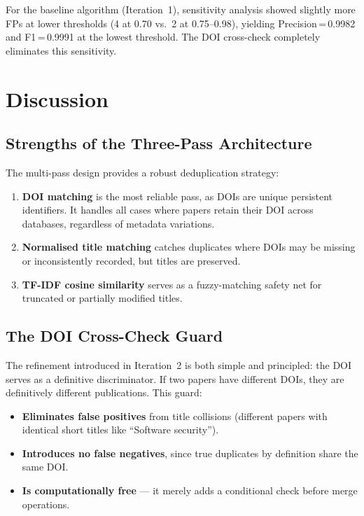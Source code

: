 \documentclass[conference]{IEEEtran}
\begin{document}
For the baseline algorithm (Iteration~1), sensitivity analysis showed slightly more FPs at lower thresholds (4 at 0.70 vs.\ 2 at 0.75--0.98), yielding Precision\,=\,0.9982 and F1\,=\,0.9991 at the lowest threshold. The DOI cross-check completely eliminates this sensitivity.

\section{Discussion}

\subsection{Strengths of the Three-Pass Architecture}

The multi-pass design provides a robust deduplication strategy:

\begin{enumerate}
    \item \textbf{DOI matching} is the most reliable pass, as DOIs are unique persistent identifiers. It handles all cases where papers retain their DOI across databases, regardless of metadata variations.
    \item \textbf{Normalised title matching} catches duplicates where DOIs may be missing or inconsistently recorded, but titles are preserved.
    \item \textbf{TF-IDF cosine similarity} serves as a fuzzy-matching safety net for truncated or partially modified titles.
\end{enumerate}

\subsection{The DOI Cross-Check Guard}

The refinement introduced in Iteration~2 is both simple and principled: the DOI serves as a definitive discriminator. If two papers have different DOIs, they are definitively different publications. This guard:

\begin{itemize}
    \item \textbf{Eliminates false positives} from title collisions (different papers with identical short titles like ``Software security'').
    \item \textbf{Introduces no false negatives}, since true duplicates by definition share the same DOI.
    \item \textbf{Is computationally free} --- it merely adds a conditional check before merge operations.
\end{itemize}
\end{document}
